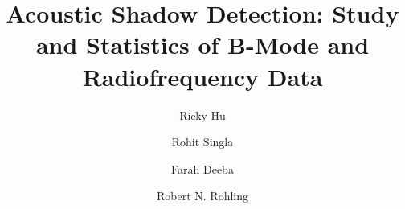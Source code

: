\documentclass[preprint,5p,authoryear]{elsarticle}
\begin{document}
\begin{frontmatter}



\title{Acoustic Shadow Detection: Study and Statistics of B-Mode and Radiofrequency Data}






\author[Affil1]{Ricky Hu }
\author[Affil1]{Rohit Singla}
\author[Affil1]{Farah Deeba}
\author[Affil1,Affil2]{Robert N. Rohling}

\address[Affil1]{Department of Electrical and Computer Engineering, University of British Columbia, Vancouver, Canada}
\address[Affil2]{Department of Mechanical Engineering, University of British Columbia, Vancouver, Canada}



\end{frontmatter}
\end{document}
